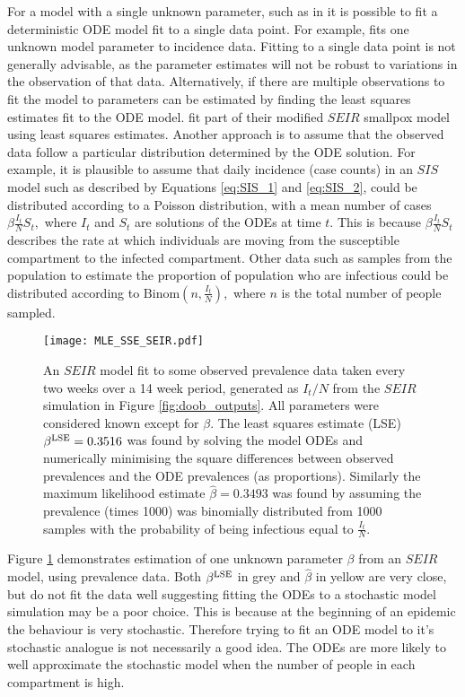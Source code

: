 For a model with a single unknown parameter, such as in
it is possible to fit a deterministic ODE model
fit to a single data point. For example, \cite{champagne_using_2022} fits one
unknown model parameter to incidence data. Fitting to a single data point
is not generally advisable, as the parameter estimates will not be
robust to variations in the observation of that data.
Alternatively, if there are multiple observations to fit the model to
parameters can be estimated by finding the least squares estimates fit to
the ODE model.
\cite{gani_transmission_2001} fit part of their modified $SEIR$ smallpox model
using least squares estimates.
Another approach
is to assume that the observed data follow a particular distribution
determined by the ODE solution. For example, it is plausible to assume that
daily incidence (case counts) in an $SIS$ model such as described by Equations
\ref{eq:SIS_1} and \ref{eq:SIS_2},
could be distributed according to a Poisson
distribution, with a mean number of cases $\beta \frac{I_t}{N}S_t,$ where $I_t$
and $S_t$ are solutions of the ODEs at time $t$. This is because
$\beta \frac{I_t}{N}S_t$ describes the rate at which individuals are moving
from the susceptible compartment to the infected compartment.
Other data such as samples from the population to estimate
the proportion of population who are infectious could be
distributed according to $\mathrm{Binom}(n, \frac{I_t}{N}),$
where $n$ is the total number
of people sampled.

\begin{figure}[htbp]
    \centering
    \texttt{[image: MLE\_SSE\_SEIR.pdf]}
    \caption{
        An $SEIR$ model fit to some observed prevalence data taken every two
        weeks over a 14 week period, generated as $I_t/N$ from the $SEIR$
        simulation in Figure \ref{fig:doob_outputs}.
        All parameters were considered known except for $\beta$.
        The least squares estimate (LSE) $\beta^{\mathrm{LSE}} = 0.3516$
        was found by solving the model ODEs and numerically minimising the
        square differences between observed prevalences and the ODE prevalences
        (as proportions). Similarly the maximum likelihood estimate
        $\hat{\beta} = 0.3493$
        was found by assuming the prevalence (times 1000) was binomially
        distributed from 1000 samples with the probability of being infectious
        equal to $\frac{I_t}{N}.$
    }
    \label{fig:MLE_SSE}
\end{figure}

Figure \ref{fig:MLE_SSE} demonstrates estimation of one unknown parameter
$\beta$ from an $SEIR$ model,
using prevalence data. Both $\beta^{\mathrm{LSE}}$ in grey and $\hat{\beta}$ in yellow
are very close, but do
not fit the data well suggesting fitting the ODEs to a stochastic model
simulation may be a poor choice. This is because at the beginning of an
epidemic the behaviour is very stochastic. Therefore trying to fit an ODE model
to it's stochastic analogue is not necessarily a good idea. The ODEs are more
likely to well approximate the stochastic model when the number of people in
each compartment is high.

